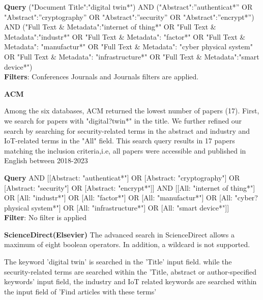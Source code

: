 \begin{tcolorbox}[colback=black!5!white, sharp corners=all, colframe=white!95!black]
\textbf{Query}
\tcblower
("Document Title":"digital twin*") AND ("Abstract":”authenticat*” OR "Abstract":”cryptography” OR "Abstract":”security” OR "Abstract":”encrypt*”) AND ("Full Text \& Metadata":"internet of thing*" OR "Full Text \& Metadata":"industr*" OR "Full Text \& Metadata": "factor*" OR "Full Text \& Metadata": "manufactur*" OR "Full Text \& Metadata": "cyber physical system" OR "Full Text \& Metadata": "infrastructure*" OR "Full Text \& Metadata":"smart device*")  \\

\textbf{Filters}: Conferences Journals and Journals filters are applied. 
\end{tcolorbox}

\textbf{ACM}

Among the six databases, ACM returned the lowest number of papers (17). First, we search for papers with "digital?twin*" in the title. We further refined our search by searching for security-related terms in the abstract and industry and IoT-related terms in the "All" field. This search query results in 17 papers matching the inclusion criteria,i.e, all papers were accessible and published in English between 2018-2023

\begin{tcolorbox}[colback=black!5!white, sharp corners=all, colframe=white!95!black]
\textbf{Query}
 AND [[Abstract: "authenticat*"] OR [Abstract: "cryptography"] OR [Abstract: "security"] OR [Abstract: "encrypt*"]] AND [[All: "internet of thing*"] OR [All: "industr*"] OR [All: "factor*"] OR [All: "manufactur*"] OR [All: "cyber?physical system*"] OR [All: "infrastructure*"] OR [All: "smart device*"]]\\

\textbf{Filter}: No filter is applied

\end{tcolorbox}


\textbf{ScienceDirect(Elsevier)}
The advanced search in ScienceDirect allows a maximum of eight boolean operators. In addition, a wildcard is not supported. 

The keyword 'digital twin' is searched in the 'Title' input field. while the security-related terms are searched within the 'Title, abstract or author-specified keywords' input field,  the industry and IoT related keywords are searched within the input field of 'Find articles with these terms'

